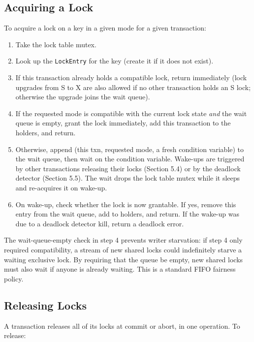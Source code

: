 \documentclass[11pt,a4paper]{article}
\begin{document}
\subsection{Acquiring a Lock}
To acquire a lock on a key in a given mode for a given transaction:

\begin{enumerate}
\item Take the lock table mutex.
\item Look up the \texttt{LockEntry} for the key (create it if it does not exist).
\item If this transaction already holds a compatible lock, return immediately (lock upgrades from S to X are also allowed if no other transaction holds an S lock; otherwise the upgrade joins the wait queue).
\item If the requested mode is compatible with the current lock state \textit{and} the wait queue is empty, grant the lock immediately, add this transaction to the holders, and return.
\item Otherwise, append (this txn, requested mode, a fresh condition variable) to the wait queue, then wait on the condition variable. Wake-ups are triggered by other transactions releasing their locks (Section 5.4) or by the deadlock detector (Section 5.5). The wait drops the lock table mutex while it sleeps and re-acquires it on wake-up.
\item On wake-up, check whether the lock is now grantable. If yes, remove this entry from the wait queue, add to holders, and return. If the wake-up was due to a deadlock detector kill, return a deadlock error.
\end{enumerate}

The wait-queue-empty check in step 4 prevents writer starvation: if step 4 only required compatibility, a stream of new shared locks could indefinitely starve a waiting exclusive lock. By requiring that the queue be empty, new shared locks must also wait if anyone is already waiting. This is a standard FIFO fairness policy.

\subsection{Releasing Locks}
A transaction releases all of its locks at commit or abort, in one operation. To release:
\end{document}
